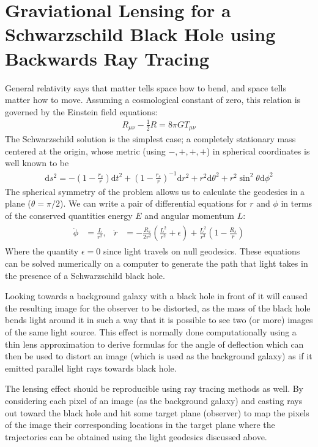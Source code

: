 \documentclass{article}
\begin{document}
\section*{Graviational Lensing for a Schwarzschild Black Hole using Backwards Ray Tracing}
	General relativity says that matter tells space how to bend, and space tells matter how to move. Assuming a cosmological constant of zero, this relation is governed by the Einstein field equations:
	\begin{align}
		R_{\mu\nu}-\frac{1}{2}R=8\pi G T_{\mu\nu}
	\end{align}
	The Schwarzschild solution is the simplest case; a completely stationary mass centered at the origin, whose metric (using \(-,+,+,+\)) in spherical coordinates is well known to be
	\begin{align}
		\mathrm{d}s^{2}=-\left(1-\frac{r_{s}}{r}\right)\mathrm{d}t^{2}+\left(1-\frac{r_{s}}{r}\right)^{-1}\mathrm{d}r^{2}+r^{2}\mathrm{d}\theta^{2}+r^{2}\sin^{2}\theta\mathrm{d}\phi^{2}
	\end{align}
	The spherical symmetry of the problem allows us to calculate the geodesics in a plane (\(\theta=\pi/2\)). We can write a pair of differential equations for \(r\) and \(\phi\) in terms of the conserved quantities energy \(E\) and angular momentum \(L\):
	\begin{align} \label{eq:eom}
		\begin{aligned}
			\ddot{\phi}&=\frac{L}{r^{2}}, & \ddot{r}&=-\frac{R_{s}}{2r^{2}}\left(\frac{L^{2}}{r^{2}}+\epsilon\right)+\frac{L^{2}}{r^{3}}\left(1-\frac{R_{s}}{r}\right)
		\end{aligned}
	\end{align}
	Where the quantity \(\epsilon=0\) since light travels on null geodesics. These equations can be solved numerically on a computer to generate the path that light takes in the presence of a Schwarzschild black hole. 
	
	Looking towards a background galaxy with a black hole in front of it will caused the resulting image for the observer to be distorted, as the mass of the black hole bends light around it in such a way that it is possible to see two (or more) images of the same light source. This effect is normally done computationally using a thin lens approximation to derive formulas for the angle of deflection which can then be used to distort an image (which is used as the background galaxy) as if it emitted parallel light rays towards black hole.
	
	The lensing effect should be reproducible using ray tracing methods as well. By considering each pixel of an image (as the background galaxy) and casting rays out toward the black hole and hit some target plane (observer) to map the pixels of the image their corresponding locations in the target plane where the trajectories can be obtained using the light geodesics discussed above.
	
\end{document}
